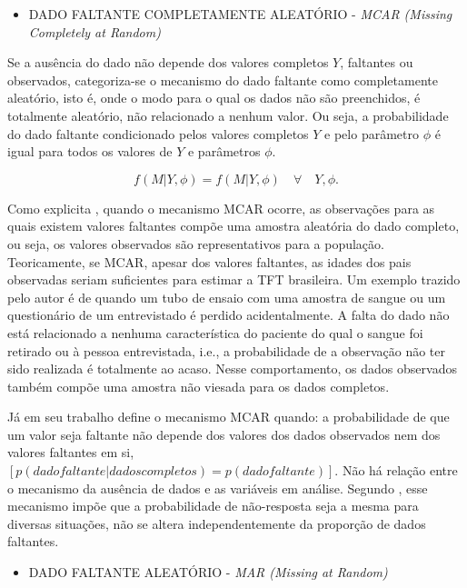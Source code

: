 \begin{itemize}
    \item DADO FALTANTE COMPLETAMENTE ALEATÓRIO - \textit{MCAR (Missing Completely at Random)}
\end{itemize}
  
Se a ausência do dado não depende dos valores completos $Y$, faltantes ou observados, categoriza-se o mecanismo do dado faltante como completamente aleatório, isto é, onde o modo para o qual os dados não são preenchidos, é totalmente aleatório, não relacionado a nenhum valor. Ou seja, a probabilidade do dado faltante condicionado pelos valores completos $Y$ e pelo parâmetro $\phi$ é igual para todos os valores de $Y$ e parâmetros $\phi$.

\begin{equation} \label{relacao_data}
f(M|Y, \phi)= f(M|Y, \phi) \quad   \forall \quad  Y, \phi. 
\end{equation}
    
Como explicita , quando o mecanismo MCAR ocorre, as observações para as quais existem valores faltantes compõe uma amostra aleatória do dado completo, ou seja, os valores observados são representativos para a população. Teoricamente, se MCAR, apesar dos valores faltantes, as idades dos pais observadas seriam suficientes para estimar a TFT brasileira. Um exemplo trazido pelo autor é de quando um tubo de ensaio com uma amostra de sangue ou um questionário de um entrevistado é perdido acidentalmente. A falta do dado não está relacionado a nenhuma característica do paciente do qual o sangue foi retirado ou à pessoa entrevistada, i.e., a probabilidade de a observação não ter sido realizada é totalmente ao acaso. Nesse comportamento, os dados observados também compõe uma amostra não viesada para os dados completos. 

Já  em seu trabalho define o mecanismo MCAR quando: a probabilidade de que um valor seja faltante não depende dos valores dos dados observados nem dos valores faltantes em si, $[p(dado faltante|dados completos) = p(dado faltante)]$. Não há relação entre o mecanismo da ausência de dados e as variáveis em análise. Segundo , esse mecanismo impõe que a probabilidade de não-resposta seja a mesma para diversas situações, não se altera independentemente da proporção de dados faltantes.

\begin{itemize}
    \item DADO FALTANTE ALEATÓRIO - \textit{MAR (Missing at Random)}
\end{itemize}


